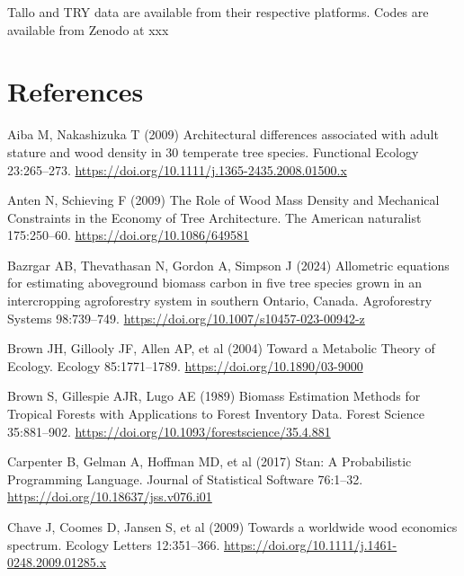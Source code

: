 \documentclass[
  12pt,
  letterpaper,
  DIV=11,
  numbers=noendperiod]{scrartcl}
\newlength{\cslhangindent}
\newlength{\cslentryspacingunit} %
\newenvironment{CSLReferences}[2] %
 {%
  \setlength{\parindent}{0pt}
  \ifodd #1
  \let\oldpar\par
  \def\par{\hangindent=\cslhangindent\oldpar}
  \fi
  \setlength{\parskip}{#2\cslentryspacingunit}
 }%
 {}
\begin{document}
Tallo and TRY data are available from their respective platforms. Codes
are available from Zenodo at xxx

\newpage

\hypertarget{references}{%
\section*{References}\label{references}}

\hypertarget{refs}{}
\begin{CSLReferences}{1}{0}
\leavevmode{}%
Aiba M, Nakashizuka T (2009) Architectural differences associated with
adult stature and wood density in 30 temperate tree species. Functional
Ecology 23:265--273.
\url{https://doi.org/10.1111/j.1365-2435.2008.01500.x}

\leavevmode{}%
Anten N, Schieving F (2009) The {Role} of {Wood} {Mass} {Density} and
{Mechanical} {Constraints} in the {Economy} of {Tree} {Architecture}.
The American naturalist 175:250--60.
\url{https://doi.org/10.1086/649581}

\leavevmode{}%
Bazrgar AB, Thevathasan N, Gordon A, Simpson J (2024) Allometric
equations for estimating aboveground biomass carbon in five tree species
grown in an intercropping agroforestry system in southern {Ontario},
{Canada}. Agroforestry Systems 98:739--749.
\url{https://doi.org/10.1007/s10457-023-00942-z}

\leavevmode{}%
Brown JH, Gillooly JF, Allen AP, et al (2004) Toward a {Metabolic}
{Theory} of {Ecology}. Ecology 85:1771--1789.
\url{https://doi.org/10.1890/03-9000}

\leavevmode{}%
Brown S, Gillespie AJR, Lugo AE (1989) Biomass {Estimation} {Methods}
for {Tropical} {Forests} with {Applications} to {Forest} {Inventory}
{Data}. Forest Science 35:881--902.
\url{https://doi.org/10.1093/forestscience/35.4.881}

\leavevmode{}%
Carpenter B, Gelman A, Hoffman MD, et al (2017) Stan: {A}
{Probabilistic} {Programming} {Language}. Journal of Statistical
Software 76:1--32. \url{https://doi.org/10.18637/jss.v076.i01}

\leavevmode{}%
Chave J, Coomes D, Jansen S, et al (2009) Towards a worldwide wood
economics spectrum. Ecology Letters 12:351--366.
\url{https://doi.org/10.1111/j.1461-0248.2009.01285.x}


\end{CSLReferences}
\end{document}
